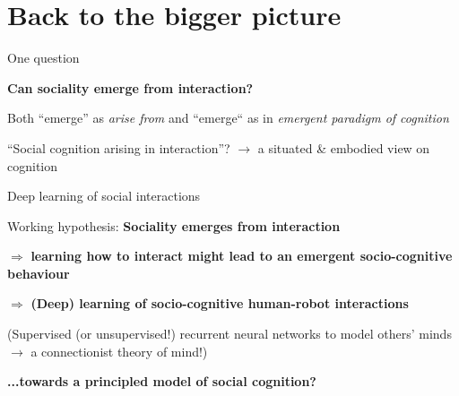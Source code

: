 \documentclass[compress]{beamer}
\begin{document}

\section[Conclusion]{Back to the bigger picture}

\begin{frame}{One question}

    \Large
    \centering

    {\bf Can sociality emerge from interaction?}

    \pause
    \normalsize
    \vspace{2em}

    Both ``emerge'' as \emph{arise from} and ``emerge`` as in \emph{emergent paradigm of
    cognition}

    \pause

    ``Social cognition arising in interaction''? $\rightarrow$ a situated \&
    embodied view on cognition

\end{frame}

\begin{frame}{Deep learning of social interactions}

    \large

    \begin{center}

    Working hypothesis: \textbf{Sociality emerges from interaction}


    \pause

    $\Rightarrow$ {\bf learning how to interact might lead to an emergent
    socio-cognitive behaviour}
   
    \pause

    $\Rightarrow$ {\bf (Deep) learning of socio-cognitive human-robot interactions}



    \normalsize

        (Supervised (or unsupervised!) recurrent neural networks to model others'
            minds $\rightarrow$ a connectionist theory of mind!)


    \pause
    \vspace{2em}
    {\bf ...towards a principled model of social cognition?}

    \end{center}

\end{frame}
\end{document}
